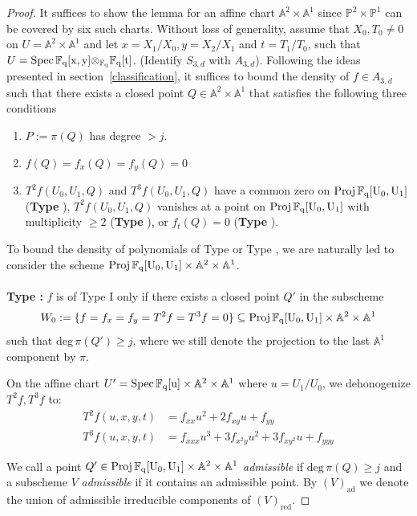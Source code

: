 \documentclass[12pt]{article}
\theoremstyle{plain}
\theoremstyle{definition}
\newcommand{\IA}{\mathbb{A}}
\newcommand{\IF}{\mathbb{F}}
\newcommand{\IP}{\mathbb{P}}
\renewcommand{\deg}{\mathrm{deg}\,}
\newcommand{\Spec}{\rm Spec\,}
\newcommand{\Proj}{\rm Proj\,}
\newcommand\tensor{{\otimes}}
\newcommand{\<}{\langle}
\renewcommand{\>}{\rangle}
\newcommand{\ad}{\mathrm{ad}}
\begin{document}
\begin{proof}
It suffices to show the lemma for an affine chart $\IA^2 \times \IA^1$ since $\IP^2 \times \IP^1$ can be covered by six such charts. Without loss of generality, assume that $X_0, T_0 \neq 0$ on $U = \IA^2 \times \IA^1$ and let $x = X_1/X_0, y = X_2/X_1$ and $t = T_1/T_0$, such that $U = \Spec \IF_q[x, y] \tensor_{\IF_q} \IF_q[t]$. (Identify $S_{3, d}$ with $A_{3, d}$). Following the ideas presented in section~\ref{classification}, it suffices to bound the density of $f \in A_{3, d}$ such that there exists a closed point $Q \in \IA^2 \times \IA^1$ that satisfies the following three conditions
\begin{enumerate}
\item $P := \pi(Q)$ has degree $> j$. 
\item $f(Q) = f_x(Q) = f_y(Q) = 0$
\item $T^2 f(U_0, U_1, Q)$ and $T^3 f(U_0, U_1, Q)$ have a common zero on $\Proj \IF_q[U_0, U_1]$ (\textbf{Type \uppercase\expandafter{}}), $T^2 f(U_0, U_1, Q)$ vanishes at a point on $\Proj \IF_q[U_0, U_1]$ with multiplicity $\ge 2$ (\textbf{Type \uppercase\expandafter{}}), or $f_t(Q) = 0$ (\textbf{Type \uppercase\expandafter{}}).
\end{enumerate}

To bound the density of polynomials of Type \uppercase\expandafter{} or Type \uppercase\expandafter{}, we are naturally led to consider the scheme $\Proj \IF_q[U_0, U_1] \times \IA^2 \times \IA^1$. \\\\
\textbf{Type \uppercase\expandafter{}: } $f$ is of Type I only if there exists a closed point $Q'$ in the subscheme
$$ W_0 := \{f = f_x = f_y = T^2 f = T^3 f = 0\} \subseteq \Proj \IF_q[U_0, U_1] \times \IA^2 \times \IA^1 $$
such that $\deg \pi(Q') \ge j$, where we still denote the projection to the last $\IA^1$ component by $\pi$. 

On the affine chart $U' = \Spec \IF_q[u] \times \IA^2 \times \IA^1$ where $u = U_1/U_0$, we dehonogenize $T^2 f, T^3 f$ to:
\begin{align*}
T^2 f(u, x, y, t) &= f_{xx} u^2 + 2 f_{xy} u + f_{yy} \\
T^3 f(u, x, y, t) &= f_{xxx} u^3 + 3 f_{x^2 y} u^2 + 3 f_{xy^2}u + f_{yyy} 
\end{align*}

We call a point $Q' \in \Proj \IF_q[U_0, U_1] \times \IA^2 \times \IA^1$ \textit{admissible} if $\deg \pi(Q) \ge j$ and a subscheme $V$ \textit{admissible} if it contains an admissible point. By $(V)_\ad$ we denote the union of admissible irreducible components of $(V)_{\mathrm{red}}$. 



\end{proof}
\end{document}
